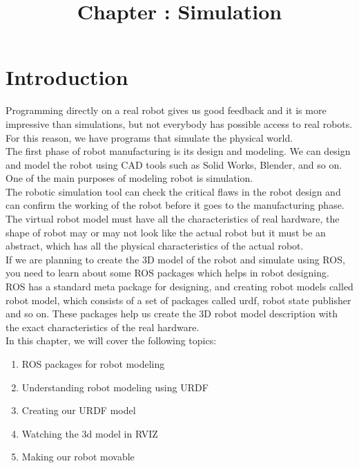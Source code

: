 \documentclass[a4paper]{article}
\title{Chapter :     Simulation}
\begin{document}
\maketitle

\section{Introduction}
Programming directly on a real robot gives us good feedback and it is more impressive
than simulations, but not everybody has possible access to real robots. For this reason,
we have programs that simulate the physical world.\\
The first phase of robot manufacturing is its design and modeling. We can design and model the 
robot using CAD tools such as Solid Works, Blender, and so on. One of the main purposes 
of modeling robot is simulation.
\\The robotic simulation tool can check the critical flaws in the robot design and can confirm the 
working of the robot before it goes to the manufacturing phase.
\\The virtual robot model must have all the characteristics of real hardware, the shape of robot 
may or may not look like the actual robot but it must be an abstract, which has all the physical 
characteristics of the actual robot.
\\If we are planning to create the 3D model of the robot and simulate using ROS, you need to learn 
about some ROS packages which helps in robot designing.
\\ ROS has a standard meta package for designing, and creating robot models called robot model, 
which consists of a set of packages called urdf, robot state publisher and so on. 
These packages help us create the 3D robot model description with the exact characteristics of the 
real hardware.
\\ In this chapter, we will cover the following topics:
\begin{enumerate}
\item ROS packages for robot modeling

\item    Understanding robot modeling using URDF

\item    Creating our URDF model

\item   Watching the 3d model in RVIZ
\item   Making our robot movable

\end{enumerate}
\end{document}
